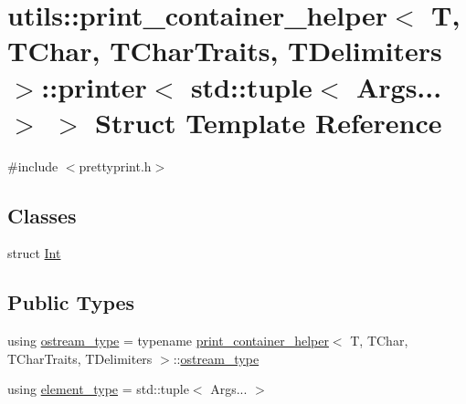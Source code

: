 \hypertarget{structutils_1_1print__container__helper_1_1printer_3_01std_1_1tuple_3_01_args_8_8_8_01_4_01_4}{}\section{utils\+::print\+\_\+container\+\_\+helper$<$ T, T\+Char, T\+Char\+Traits, T\+Delimiters $>$\+::printer$<$ std\+::tuple$<$ Args... $>$ $>$ Struct Template Reference}
\label{structutils_1_1print__container__helper_1_1printer_3_01std_1_1tuple_3_01_args_8_8_8_01_4_01_4}


{\ttfamily \#include $<$prettyprint.\+h$>$}

\subsection*{Classes}
\begin{DoxyCompactItemize}
\item 
struct \mbox{\hyperlink{structutils_1_1print__container__helper_1_1printer_3_01std_1_1tuple_3_01_args_8_8_8_01_4_01_4_1_1_int}{Int}}
\end{DoxyCompactItemize}
\subsection*{Public Types}
\begin{DoxyCompactItemize}
\item 
using \mbox{\hyperlink{structutils_1_1print__container__helper_1_1printer_3_01std_1_1tuple_3_01_args_8_8_8_01_4_01_4_a7a89933fa31d7a79f454cdf36211a73a}{ostream\+\_\+type}} = typename \mbox{\hyperlink{structutils_1_1print__container__helper}{print\+\_\+container\+\_\+helper}}$<$ T, T\+Char, T\+Char\+Traits, T\+Delimiters $>$\+::\mbox{\hyperlink{structutils_1_1print__container__helper_1_1printer_3_01std_1_1tuple_3_01_args_8_8_8_01_4_01_4_a7a89933fa31d7a79f454cdf36211a73a}{ostream\+\_\+type}}
\item 
using \mbox{\hyperlink{structutils_1_1print__container__helper_1_1printer_3_01std_1_1tuple_3_01_args_8_8_8_01_4_01_4_a1ca86cb16c37518fb257879ce8026459}{element\+\_\+type}} = std\+::tuple$<$ Args... $>$
\end{DoxyCompactItemize}
